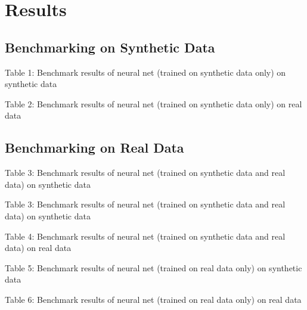 \documentclass[11pt]{article}
\begin{document}
\section{Results}
\subsection{Benchmarking on Synthetic Data}

\begin{center}
	
\qquad

\end{center}
\begin{center}
Table 1: Benchmark results of neural net (trained on synthetic data only) on synthetic data

Table 2: Benchmark results of neural net (trained on synthetic data only) on real data
\end{center}


\subsection{Benchmarking on Real Data}

\begin{center}

\end{center}
\begin{center}
Table 3: Benchmark results of neural net (trained on synthetic data and real data) on synthetic data
\end{center}


\begin{center}

\qquad

\end{center}
\begin{center}
Table 3: Benchmark results of neural net (trained on synthetic data and real data) on synthetic data

Table 4: Benchmark results of neural net (trained on synthetic data and real data) on real data
\end{center}

\begin{center}

\qquad

\end{center}
\begin{center}
Table 5: Benchmark results of neural net (trained on real data only) on synthetic data

Table 6: Benchmark results of neural net (trained on real data only) on real data
\end{center}
\end{document}
